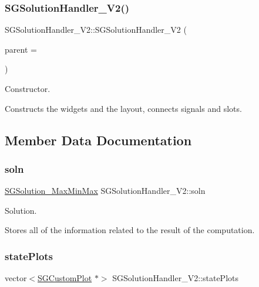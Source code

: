 \subsubsection{\texorpdfstring{S\+G\+Solution\+Handler\+\_\+\+V2()}{SGSolutionHandler\_V2()}}
{\footnotesize\ttfamily S\+G\+Solution\+Handler\+\_\+\+V2\+::\+S\+G\+Solution\+Handler\+\_\+\+V2 (\begin{DoxyParamCaption}\item[{Q\+Widget $\ast$}]{parent = {} }\end{DoxyParamCaption})}



Constructor. 

Constructs the widgets and the layout, connects signals and slots. 

\subsection{Member Data Documentation}
\mbox{\label{classSGSolutionHandler__V2_aa30a9feaa68d90e4c83656249d18bb24}} 
\subsubsection{\texorpdfstring{soln}{soln}}
{\footnotesize\ttfamily \hyperlink{classSGSolution__MaxMinMax}{S\+G\+Solution\+\_\+\+Max\+Min\+Max} S\+G\+Solution\+Handler\+\_\+\+V2\+::soln\hspace{0.3cm}{\ttfamily [private]}}



Solution. 

Stores all of the information related to the result of the computation. \mbox{\label{classSGSolutionHandler__V2_aea3af246200c2fc2153c3da67a96dcaa}} 
\subsubsection{\texorpdfstring{state\+Plots}{statePlots}}
{\footnotesize\ttfamily vector$<$\hyperlink{classSGCustomPlot}{S\+G\+Custom\+Plot} $\ast$$>$ S\+G\+Solution\+Handler\+\_\+\+V2\+::state\+Plots\hspace{0.3cm}{\ttfamily [private]}}



